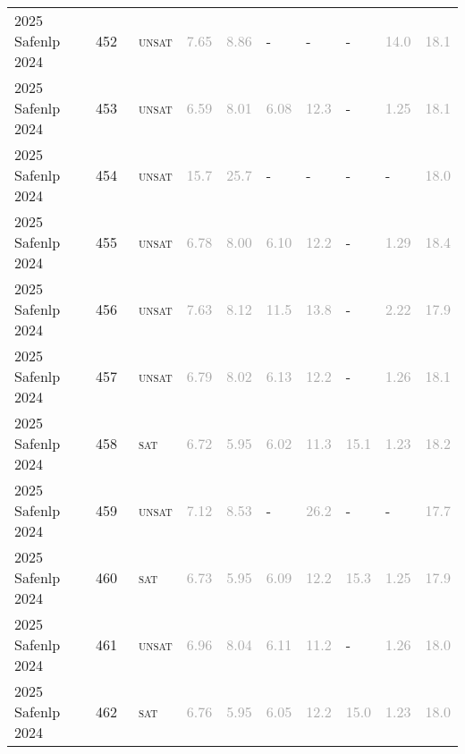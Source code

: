 \begin{center}
{\begin{longtable}{@{}llllllllll@{}}
2025 Safenlp 2024 & 452 & ~\textsc{unsat} & \textcolor{darkgray}{7.65} & \textcolor{darkgray}{8.86} & - & - & - & \textcolor{darkgray}{14.0} & \textcolor{darkgray}{18.1} \\
2025 Safenlp 2024 & 453 & ~\textsc{unsat} & \textcolor{darkgray}{6.59} & \textcolor{darkgray}{8.01} & \textcolor{darkgray}{6.08} & \textcolor{darkgray}{12.3} & - & \textcolor{darkgray}{1.25} & \textcolor{darkgray}{18.1} \\
2025 Safenlp 2024 & 454 & ~\textsc{unsat} & \textcolor{darkgray}{15.7} & \textcolor{darkgray}{25.7} & - & - & - & - & \textcolor{darkgray}{18.0} \\
2025 Safenlp 2024 & 455 & ~\textsc{unsat} & \textcolor{darkgray}{6.78} & \textcolor{darkgray}{8.00} & \textcolor{darkgray}{6.10} & \textcolor{darkgray}{12.2} & - & \textcolor{darkgray}{1.29} & \textcolor{darkgray}{18.4} \\
2025 Safenlp 2024 & 456 & ~\textsc{unsat} & \textcolor{darkgray}{7.63} & \textcolor{darkgray}{8.12} & \textcolor{darkgray}{11.5} & \textcolor{darkgray}{13.8} & - & \textcolor{darkgray}{2.22} & \textcolor{darkgray}{17.9} \\
2025 Safenlp 2024 & 457 & ~\textsc{unsat} & \textcolor{darkgray}{6.79} & \textcolor{darkgray}{8.02} & \textcolor{darkgray}{6.13} & \textcolor{darkgray}{12.2} & - & \textcolor{darkgray}{1.26} & \textcolor{darkgray}{18.1} \\
2025 Safenlp 2024 & 458 & ~\textsc{sat} & \textcolor{darkgray}{6.72} & \textcolor{darkgray}{5.95} & \textcolor{darkgray}{6.02} & \textcolor{darkgray}{11.3} & \textcolor{darkgray}{15.1} & \textcolor{darkgray}{1.23} & \textcolor{darkgray}{18.2} \\
2025 Safenlp 2024 & 459 & ~\textsc{unsat} & \textcolor{darkgray}{7.12} & \textcolor{darkgray}{8.53} & - & \textcolor{darkgray}{26.2} & - & - & \textcolor{darkgray}{17.7} \\
2025 Safenlp 2024 & 460 & ~\textsc{sat} & \textcolor{darkgray}{6.73} & \textcolor{darkgray}{5.95} & \textcolor{darkgray}{6.09} & \textcolor{darkgray}{12.2} & \textcolor{darkgray}{15.3} & \textcolor{darkgray}{1.25} & \textcolor{darkgray}{17.9} \\
2025 Safenlp 2024 & 461 & ~\textsc{unsat} & \textcolor{darkgray}{6.96} & \textcolor{darkgray}{8.04} & \textcolor{darkgray}{6.11} & \textcolor{darkgray}{11.2} & - & \textcolor{darkgray}{1.26} & \textcolor{darkgray}{18.0} \\
2025 Safenlp 2024 & 462 & ~\textsc{sat} & \textcolor{darkgray}{6.76} & \textcolor{darkgray}{5.95} & \textcolor{darkgray}{6.05} & \textcolor{darkgray}{12.2} & \textcolor{darkgray}{15.0} & \textcolor{darkgray}{1.23} & \textcolor{darkgray}{18.0} \\

\end{longtable}}
\end{center}
